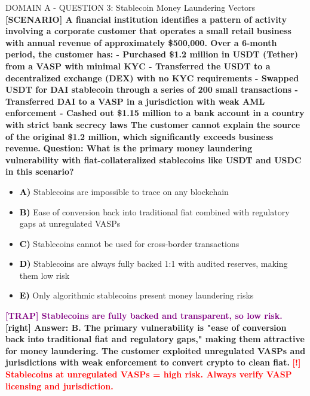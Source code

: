 \documentclass[11pt,a4paper]{beamer}
\newcommand{\redflag}[1]{\textcolor{red}{\textbf{[!] #1}}}
\newcommand{\trap}[1]{\textcolor{purple}{\textbf{[TRAP] #1}}}
\newcommand{\correct}[1]{\textcolor{green!50!black}{\textbf{[right] #1}}}
\newcommand{\scenario}[1]{\textcolor{blue!70!black}{\textbf{[SCENARIO] #1}}}
\newcommand{\option}[1]{\textcolor{black}{\textbf{#1}}}
\begin{document}
\begin{frame}{DOMAIN A - QUESTION 3: Stablecoin Money Laundering Vectors}
\scenario{A financial institution identifies a pattern of activity involving a corporate customer that operates a small retail business with annual revenue of approximately \$500,000. Over a 6-month period, the customer has:
- Purchased \$1.2 million in USDT (Tether) from a VASP with minimal KYC
- Transferred the USDT to a decentralized exchange (DEX) with no KYC requirements
- Swapped USDT for DAI stablecoin through a series of 200 small transactions
- Transferred DAI to a VASP in a jurisdiction with weak AML enforcement
- Cashed out \$1.15 million to a bank account in a country with strict bank secrecy laws
The customer cannot explain the source of the original \$1.2 million, which significantly exceeds business revenue.}
\vspace{0.2cm}
\textbf{Question: What is the primary money laundering vulnerability with fiat-collateralized stablecoins like USDT and USDC in this scenario?}
\vspace{0.1cm}
\begin{itemize}
    \item \option{A)} Stablecoins are impossible to trace on any blockchain
    \item \option{B)} Ease of conversion back into traditional fiat combined with regulatory gaps at unregulated VASPs
    \item \option{C)} Stablecoins cannot be used for cross-border transactions
    \item \option{D)} Stablecoins are always fully backed 1:1 with audited reserves, making them low risk
    \item \option{E)} Only algorithmic stablecoins present money laundering risks
\end{itemize}
\vspace{0.2cm}
\trap{Stablecoins are fully backed and transparent, so low risk.}
\correct{Answer: B. The primary vulnerability is "ease of conversion back into traditional fiat and regulatory gaps," making them attractive for money laundering. The customer exploited unregulated VASPs and jurisdictions with weak enforcement to convert crypto to clean fiat.}
\redflag{Stablecoins at unregulated VASPs = high risk. Always verify VASP licensing and jurisdiction.}
\end{frame}
\end{document}
